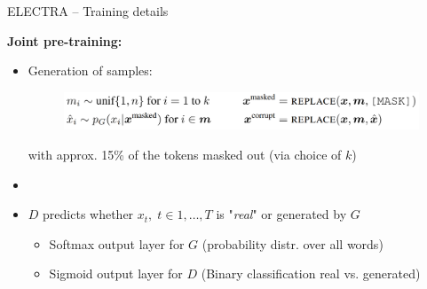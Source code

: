 
\begin{frame}{ELECTRA -- Training details}

\vfill

	\textbf{Joint pre-training:}

	\begin{itemize}
		\item Generation of samples:
	\begin{figure}
		\centering
		\includegraphics[width = 11cm]{figure/electra-samples.png}
	\end{figure}\vspace{-.25cm}
		{\footnotesize with approx. 15\% of the tokens masked out (via choice of $k$)}
		\item[]
		\item $D$ predicts whether $x_t,\; t \in 1, \hdots, T$ is "\textit{real}" or generated by $G$
			\begin{itemize}
				\item Softmax output layer for $G$ (probability distr. over all words)
				\item Sigmoid output layer for $D$ (Binary classification real vs. generated)
			\end{itemize}
	\end{itemize}
	
\vfill

\end{frame}


